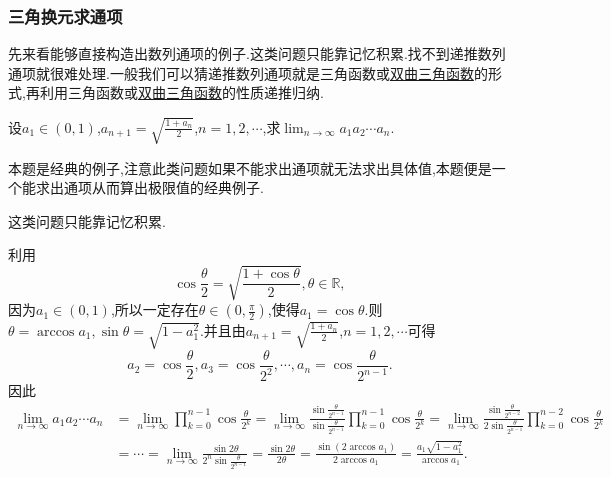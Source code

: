 \documentclass[../../main.tex]{subfiles}%
\begin{document}
\subsubsection{三角换元求通项}

先来看能够直接构造出数列通项的例子.这类问题只能靠记忆积累.找不到递推数列通项就很难处理.一般我们可以猜递推数列通项就是三角函数或\href{https://baike.baidu.com/item/%E5%8F%8C%E6%9B%B2%E5%87%BD%E6%95%B0/8704306}{双曲三角函数}的形式,再利用三角函数或\href{https://baike.baidu.com/item/%E5%8F%8C%E6%9B%B2%E5%87%BD%E6%95%B0/8704306}{双曲三角函数}的性质递推归纳.

\begin{example}\label{example:例题3.82}
设\(a_1\in(0,1)\),\(a_{n + 1}=\sqrt{\frac{1 + a_n}{2}}\),\(n = 1,2,\cdots\),求\(\lim_{n\rightarrow\infty}a_1a_2\cdots a_n\).
\end{example}
\begin{note}
本题是经典的例子,注意此类问题如果不能求出通项就无法求出具体值,本题便是一个能求出通项从而算出极限值的经典例子.
\end{note}
\begin{remark}
这类问题只能靠记忆积累.
\end{remark}
\begin{solution}
利用
\[
\cos\frac{\theta}{2}=\sqrt{\frac{1 + \cos\theta}{2}},\theta\in\mathbb{R},
\]
因为$a_1\in (0,1)$,所以一定存在$\theta\in(0,\frac{\pi}{2})$,使得\(a_1=\cos\theta\).则$\theta=\arccos a_1,\sin\theta=\sqrt{1-a_1^2}$.并且由\(a_{n + 1}=\sqrt{\frac{1 + a_n}{2}}\),\(n = 1,2,\cdots\)可得
\[
a_2=\cos\frac{\theta}{2},a_3=\cos\frac{\theta}{2^2},\cdots,a_n=\cos\frac{\theta}{2^{n - 1}}.
\]
因此
\begin{align*}
\lim_{n\rightarrow\infty}a_1a_2\cdots a_n&=\lim_{n\rightarrow\infty}\prod_{k = 0}^{n - 1}\cos\frac{\theta}{2^k}=\lim_{n\rightarrow\infty}\frac{\sin\frac{\theta}{2^{n - 1}}}{\sin\frac{\theta}{2^{n - 1}}}\prod_{k = 0}^{n - 1}\cos\frac{\theta}{2^k}=\lim_{n\rightarrow\infty}\frac{\sin\frac{\theta}{2^{n - 2}}}{2\sin\frac{\theta}{2^{n - 1}}}\prod_{k = 0}^{n - 2}\cos\frac{\theta}{2^k}\\
&=\cdots=\lim_{n\rightarrow\infty}\frac{\sin2\theta}{2^n\sin\frac{\theta}{2^{n - 1}}}=\frac{\sin2\theta}{2\theta}=\frac{\sin(2\arccos a_1)}{2\arccos a_1}=\frac{a_1\sqrt{1 - a_1^2}}{\arccos a_1}.
\end{align*}

\end{solution}
\end{document}
